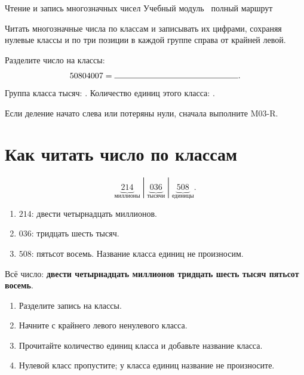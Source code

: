 \worksheettitle
  {Чтение и запись многозначных чисел}
  { Учебный модуль \textbullet\ полный маршрут}

\studentnameblock

\begin{notebox}
  Читать многозначные числа по классам и записывать их цифрами, сохраняя
  нулевые классы и по три позиции в каждой группе справа от крайней левой.
\end{notebox}

\begin{checkpointbox}
  Разделите число на классы:
  \[
    50804007=\answerblank[52mm].
  \]
  Группа класса тысяч: \answerblank[18mm]. Количество единиц этого класса:
  \answerblank[18mm].

  Если деление начато слева или потеряны нули, сначала выполните M03-R.
\end{checkpointbox}

\section{Как читать число по классам}

\begin{problembox}
  \[
    \underbrace{214}_{\text{миллионы}}\;|\;
    \underbrace{036}_{\text{тысячи}}\;|\;
    \underbrace{508}_{\text{единицы}}.
  \]
  \begin{enumerate}[label=\textbf{\arabic*.}]
    \item \(214\): двести четырнадцать миллионов.
    \item \(036\): тридцать шесть тысяч.
    \item \(508\): пятьсот восемь. Название класса единиц не произносим.
  \end{enumerate}
  Всё число: \textbf{двести четырнадцать миллионов тридцать шесть тысяч
  пятьсот восемь}.
\end{problembox}

\begin{reflectionbox}
  \begin{enumerate}[label=\textbf{\arabic*.}]
    \item Разделите запись на классы.
    \item Начните с крайнего левого ненулевого класса.
    \item Прочитайте количество единиц класса и добавьте название класса.
    \item Нулевой класс пропустите; у класса единиц название не произносите.
  \end{enumerate}
\end{reflectionbox}

